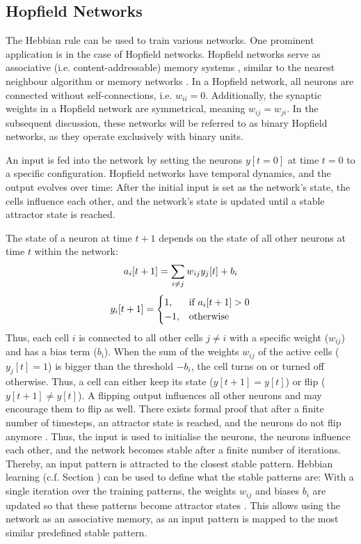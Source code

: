 \subsection{Hopfield Networks}
The Hebbian rule can be used to train various networks.
One prominent application is in the case of Hopfield networks.
Hopfield networks serve as associative (i.e. content-addressable) memory systems , similar to the nearest neighbour algorithm  or memory networks .
In a Hopfield network, all neurons are connected without self-connections, i.e. $w_{ii}=0$.
Additionally, the synaptic weights in a Hopfield network are symmetrical, meaning \(w_{ij} = w_{ji}\).
In the subsequent discussion, these networks will be referred to as binary Hopfield networks, as they operate exclusively with binary units.

An input is fed into the network by setting the neurons $y[t=0]$ at time $t=0$ to a specific configuration.
Hopfield networks have temporal dynamics, and the output evolves over time: After the initial input is set as the network's state, the cells influence each other, and the network's state is updated until a stable attractor state is reached.

The state of a neuron at time $t+1$ depends on the state of all other neurons at time $t$ within the network:
%
\begin{align}\eqlbl{hf_1}
	a_i[t+1] = \sum_{i \neq j} w_{ij} y_j[t] + b_i
\end{align}
%
\begin{align}\eqlbl{hf_2}
	y_i[t+1] = \begin{cases}
      		1, & \text{if } a_i[t+1] > 0 \\
      		-1, & \text{otherwise}
    	\end{cases}
\end{align}
%
Thus, each cell $i$ is connected to all other cells $j \neq i$ with a specific weight ($w_{ij}$) and has a bias term ($b_i$). 
When the sum of the weights $w_{ij}$ of the active cells ($y_j[t] = 1$) is bigger than the threshold $-b_i$, the cell turns on or turned off otherwise.
Thus, a cell can either keep its state ($y[t+1] = y[t]$) or flip ($y[t+1] \neq y[t]$).
A flipping output influences all other neurons and may encourage them to flip as well.
There exists formal proof that after a finite number of timesteps, an attractor state is reached, and the neurons do not flip anymore .
Thus, the input is used to initialise the neurons, the neurons influence each other, and the network becomes stable after a finite number of iterations. Thereby, an input pattern is attracted to the closest stable pattern.
Hebbian learning (c.f. Section ) can be used to define what the stable patterns are:
With a single iteration over the training patterns, the weights $w_{ij}$ and biases $b_i$ are updated so that these patterns become attractor states .
This allows using the network as an associative memory, as an input pattern is mapped to the most similar predefined stable pattern.

